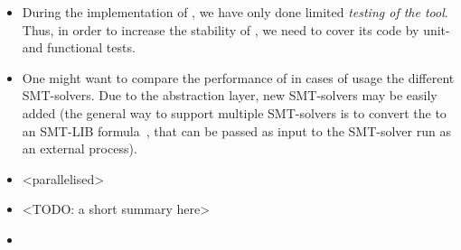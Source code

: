 \begin{itemize}[leftmargin=\parindent]
\item During the implementation of \porthos[2], we have only done limited \textit{testing of the tool}.
Thus, in order to increase the stability of \porthos[2], we need to cover its code by unit- and functional tests.

\item One might want to compare the performance of \porthos[2] in cases of usage the different SMT-solvers.
Due to the \zformula{} abstraction layer, new SMT-solvers may be easily added (the general way to support multiple SMT-solvers is to convert the \zformula{} to an SMT-LIB formula~\cite{smt-lib}, that can be passed as input to the SMT-solver run as an external process).

\item <parallelised>

\item <C processor directives + typedef > 
<TODO: a short summary here>

\item <contexts for local mem units in mem manager>

\end{itemize}
